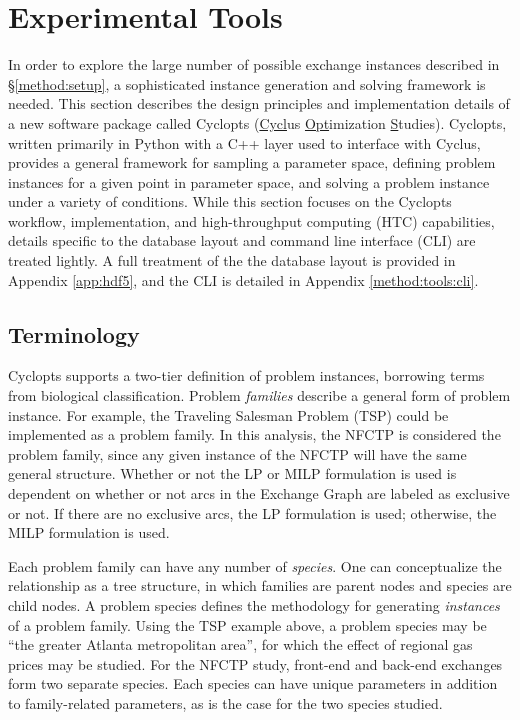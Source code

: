 
\section{Experimental Tools}\label{method:tools}

In order to explore the large number of possible exchange instances described in
\S \ref{method:setup}, a sophisticated instance generation and solving framework
is needed. This section describes the design principles and implementation
details of a new software package called Cyclopts (\underline{Cycl}us
\underline{Opt}imization \underline{S}tudies). Cyclopts, written primarily in
Python with a C++ layer used to interface with Cyclus, provides a general
framework for sampling a parameter space, defining problem instances for a given
point in parameter space, and solving a problem instance under a variety of
conditions. While this section focuses on the Cyclopts workflow, implementation,
and high-throughput computing (HTC) capabilities, details specific to the
database layout and command line interface (CLI) are treated lightly. A full
treatment of the the database layout is provided in Appendix \ref{app:hdf5}, and
the CLI is detailed in Appendix \ref{method:tools:cli}.

\subsection{Terminology}\label{method:tools:term}

Cyclopts supports a two-tier definition of problem instances, borrowing terms
from biological classification. Problem \textit{families} describe a general
form of problem instance. For example, the Traveling Salesman Problem (TSP)
could be implemented as a problem family. In this analysis, the NFCTP is
considered the problem family, since any given instance of the NFCTP will have
the same general structure. Whether or not the LP or MILP formulation is used is
dependent on whether or not arcs in the Exchange Graph are labeled as exclusive
or not. If there are no exclusive arcs, the LP formulation is used; otherwise,
the MILP formulation is used.

Each problem family can have any number of \textit{species}. One can
conceptualize the relationship as a tree structure, in which families are parent
nodes and species are child nodes. A problem species defines the methodology for
generating \textit{instances} of a problem family. Using the TSP example above,
a problem species may be ``the greater Atlanta metropolitan area'', for which
the effect of regional gas prices may be studied. For the NFCTP study, front-end
and back-end exchanges form two separate species. Each species can have unique
parameters in addition to family-related parameters, as is the case for the two
species studied.

